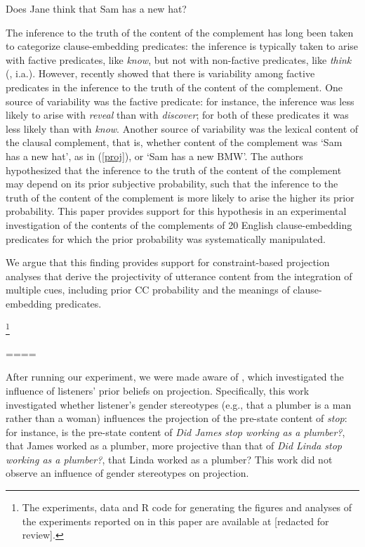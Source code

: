 \documentclass[11pt,fleqn]{article}
\newcommand{\6}{\mbox{$[\hspace*{-.6mm}[$}}
\newcommand{\9}{\mbox{$]\hspace*{-.6mm}]$}}
\begin{document}
\begin{exe}
\ex\label{proj2} Does Jane think that Sam has a new hat?
\end{exe}
The inference to the truth of the content of the complement has long been taken to categorize clause-embedding predicates: the inference is typically taken to arise with factive predicates, like {\em know}, but not with non-factive predicates, like {\em think} (\citealt{kiparsky-kiparsky70,karttunen71b}, i.a.). However, \citealt*{tbd-variability} recently showed that there is variability among factive predicates in the inference to the truth of the content of the complement. One source of variability was the factive predicate: for instance, the inference was less likely to arise with {\em reveal} than with {\em discover}; for both of these predicates it was less likely than with {\em know}. Another source of variability was the lexical content of the clausal complement, that is, whether content of the complement was `Sam has a new hat', as in (\ref{proj}), or `Sam has a new BMW'. The authors hypothesized that the inference to the truth of the content of the complement may depend on its prior subjective probability, such that the inference to the truth of the content of the complement is more likely to arise the higher its prior probability. This paper provides support for this hypothesis in an experimental investigation of the contents of the complements of 20 English clause-embedding predicates for which the prior probability was systematically manipulated. 

\newpage

We argue that this finding provides support for constraint-based projection analyses that derive the projectivity of utterance content from the integration of multiple cues, including prior CC probability and the meanings of clause-embedding predicates.

\footnote{\label{f-github}The experiments, data and R code for generating the figures and analyses of the experiments reported on in this paper are available at [redacted for review].}


====

After running our experiment, we were made aware of \citealt{lorson2018}, which investigated the influence of listeners' prior beliefs on projection. Specifically, this work investigated whether listener's gender stereotypes (e.g., that a plumber is a man rather than a woman) influences the projection of the pre-state content of {\em stop}: for instance, is the pre-state content of {\em Did James stop working as a plumber?}, that James worked as a plumber, more projective than that of {\em Did Linda stop working as a plumber?}, that Linda worked as a plumber? This work did not observe an influence of gender stereotypes on projection.
\end{document}
